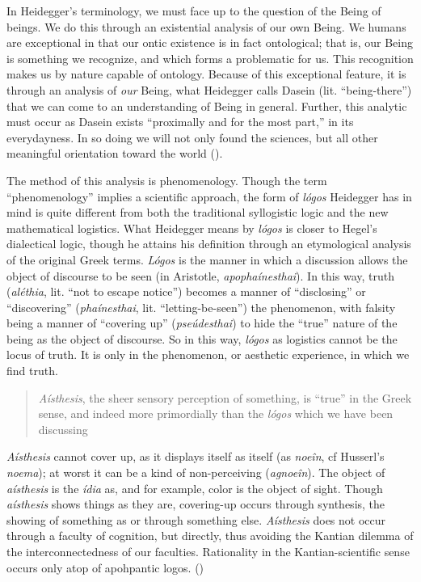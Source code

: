 \documentclass[leqno, 12pt]{turabian-researchpaper}
\begin{document}
	In Heidegger's terminology, we must face up to the question of the Being of beings.
	We do this through an existential analysis of our own Being. We humans are exceptional
	in that our ontic existence is in fact ontological; that is, our Being is something
	we recognize, and which forms a problematic for us. This recognition makes us by
	nature capable of ontology. Because of this exceptional feature, it is through
	an analysis of \emph{our} Being, what Heidegger calls Dasein (lit. \enquote{being-there})
	that we can come to an understanding of Being in general. Further, this analytic
	must occur as Dasein exists \enquote{proximally and for the most part,} in its
	everydayness. In so doing we will not only found the sciences, but all other
	meaningful orientation toward the world ().

	The method of this analysis is phenomenology. Though the term \enquote{phenomenology}
	implies a scientific approach, the form of \textit{l\'ogos} Heidegger has in mind
	is quite different from both the traditional syllogistic logic and the new mathematical
	logistics. What Heidegger means by \textit{l\'ogos} is closer to Hegel's dialectical
	logic, though he attains his definition through an etymological analysis of
	the original Greek terms. \textit{L\'ogos} is the manner in which a discussion
	allows the object of discourse to be seen (in Aristotle, \textit{apopha\'inesthai}).
	In this way, truth (\textit{al\'ethia}, lit. \enquote{not to escape notice})
	becomes a manner of \enquote{disclosing} or \enquote{discovering} (\textit{pha\'inesthai},
	lit. \enquote{letting-be-seen}) the phenomenon, with falsity being a manner of
	\enquote{covering up} (\textit{pse\'udesthai}) to hide the \enquote{true}
	nature of the being as the object of discourse. So in this way, \textit{l\'ogos}
	as logistics cannot be the locus of truth. It is only in the phenomenon, or aesthetic
	experience, in which we find truth. \blockquote[{}]
	{\textit{A\'isthesis}, %
	the sheer sensory perception of something, is \enquote{true} in the Greek sense, and indeed %
	more primordially than the \textit{l\'ogos} which we have been discussing}. \textit{A\'isthesis}
	cannot cover up, as it displays itself as itself (as \textit{noe\^in}, cf
	Husserl's \textit{noema}); at worst it can be a kind of non-perceiving (\textit{agnoe\^in}).
	The object of \textit{a\'isthesis} is the \textit{\'idia} as, and for example,
	color is the object of sight. Though \textit{a\'isthesis} shows things as they
	are, covering-up occurs through synthesis, the showing of something as or through
	something else. \textit{A\'isthesis} does not occur through a faculty of cognition,
	but directly, thus avoiding the Kantian dilemma of the interconnectedness of our
	faculties. Rationality in the Kantian-scientific sense occurs only atop of
	apohpantic logos. ()
\end{document}
